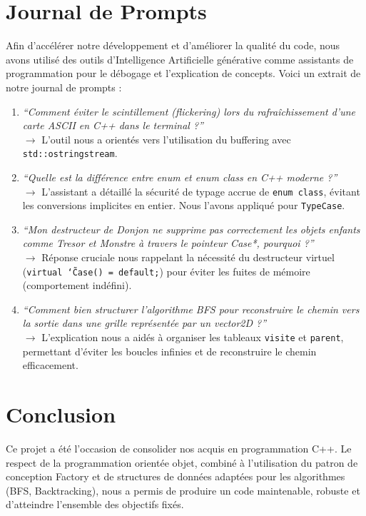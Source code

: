 \documentclass[11pt,a4paper]{article}
\begin{document}
\section{Journal de Prompts}
Afin d'accélérer notre développement et d'améliorer la qualité du code, nous avons utilisé des outils d'Intelligence Artificielle générative comme assistants de programmation pour le débogage et l'explication de concepts. Voici un extrait de notre journal de prompts :
\begin{enumerate}
    \item \textit{``Comment éviter le scintillement (flickering) lors du rafraîchissement d'une carte ASCII en C++ dans le terminal ?''} \\
    $\rightarrow$ L'outil nous a orientés vers l'utilisation du buffering avec \texttt{std::ostringstream}.
    \item \textit{``Quelle est la différence entre enum et enum class en C++ moderne ?''} \\
    $\rightarrow$ L'assistant a détaillé la sécurité de typage accrue de \texttt{enum class}, évitant les conversions implicites en entier. Nous l'avons appliqué pour \texttt{TypeCase}.
    \item \textit{``Mon destructeur de Donjon ne supprime pas correctement les objets enfants comme Tresor et Monstre à travers le pointeur Case*, pourquoi ?''} \\
    $\rightarrow$ Réponse cruciale nous rappelant la nécessité du destructeur virtuel (\texttt{virtual \char`\~Case() = default;}) pour éviter les fuites de mémoire (comportement indéfini).
    \item \textit{``Comment bien structurer l'algorithme BFS pour reconstruire le chemin vers la sortie dans une grille représentée par un vector2D ?''} \\
    $\rightarrow$ L'explication nous a aidés à organiser les tableaux \texttt{visite} et \texttt{parent}, permettant d'éviter les boucles infinies et de reconstruire le chemin efficacement.
\end{enumerate}

\section{Conclusion}
Ce projet a été l'occasion de consolider nos acquis en programmation C++. Le respect de la programmation orientée objet, combiné à l'utilisation du patron de conception Factory et de structures de données adaptées pour les algorithmes (BFS, Backtracking), nous a permis de produire un code maintenable, robuste et d'atteindre l'ensemble des objectifs fixés.
\end{document}
